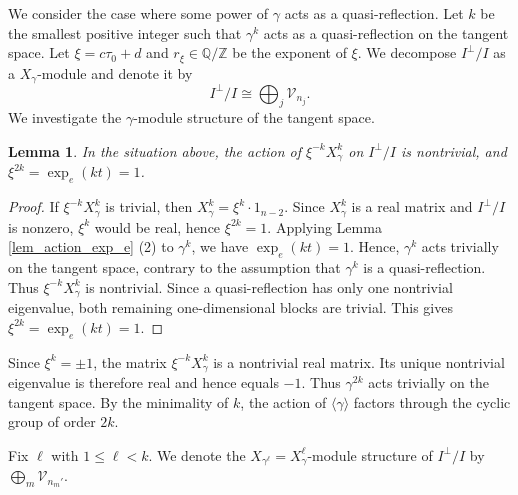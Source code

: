 \documentclass[11pt]{amsart}
\theoremstyle{plain}
\newtheorem{lem}[thm]{Lemma}
\theoremstyle{definition}
\numberwithin{equation}{section}
\def\exp{\mathop{\mathrm{exp}}\nolimits}
\newcommand{\bbQ}{\mathbb{Q}}
\newcommand{\bbZ}{\mathbb{Z}}
\newcommand{\calV}{\mathcal{V}}
\begin{document}
We consider the case where some power of $\gamma$ acts as a quasi-reflection.
Let $k$ be the smallest positive integer such that $\gamma^k$ acts as a quasi-reflection on the tangent space.
Let $\xi = c\tau_0 +d$ and $r_\xi \in \bbQ/\bbZ$ be the exponent of $\xi$.
We decompose $I^\perp/I$ as a $X_\gamma$-module and denote it by
\[
I^\perp/I \cong \bigoplus_j \calV_{n_j}.
\]
We investigate the $\gamma$-module structure of the tangent space.
\begin{lem}\label{lem_xi^2k=1}
In the situation above, the action of
$\xi^{-k}X_\gamma^k$ on $I^\perp/I$
is nontrivial, and
$\xi^{2k}=\exp_e(kt)=1$.
\end{lem}

\begin{proof}
If $\xi^{-k}X_\gamma^k$ is trivial, then
$X_\gamma^k=\xi^k \cdot 1_{n-2}$.
Since $X_\gamma^k$ is a real matrix and
$I^\perp/I$ is nonzero, $\xi^k$ would be
real, hence $\xi^{2k}=1$.
Applying Lemma \ref{lem_action_exp_e} (2) to $\gamma^k$, we have
$\exp_e(kt)=1$.
Hence, $\gamma^k$ acts trivially on the tangent space, 
contrary to the assumption
that $\gamma^k$ is a quasi-reflection.
Thus $\xi^{-k}X_\gamma^k$ is nontrivial.
Since a quasi-reflection has only one
nontrivial eigenvalue, both remaining
one-dimensional blocks are trivial.
This gives $\xi^{2k}=\exp_e(kt)=1$.
\end{proof}

Since $\xi^k=\pm1$, the matrix $\xi^{-k}X_\gamma^k$ is a nontrivial real matrix.
Its unique nontrivial eigenvalue is
therefore real and hence equals $-1$.
Thus $\gamma^{2k}$ acts trivially on the tangent space.
By the minimality of $k$, the action of $\langle \gamma \rangle$ factors through the cyclic group of order $2k$.

Fix $\ell$ with $1 \leq \ell < k$.
We denote the $X_{\gamma^\ell} = X_\gamma^\ell$-module structure of $I^\perp/I$ by $\bigoplus_m \calV_{n_m'}$.
\end{document}
